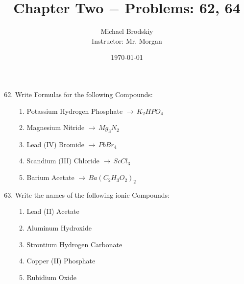 \documentclass[12pt]{article}
\title{Chapter Two $-$ Problems: 62, 64}
\date{\today}
\author{Michael Brodskiy\\ \small Instructor: Mr. Morgan}
\begin{document}
\maketitle

\begin{enumerate}
    \setcounter{enumi}{61}

  \item Write Formulas for the following Compounds:

    \begin{enumerate}

      \item Potassium Hydrogen Phosphate $\rightarrow\, K_2HPO_4$

      \item Magnesium Nitride $\rightarrow\, Mg_3N_2$

      \item Lead (IV) Bromide $\rightarrow\, PbBr_4$

      \item Scandium (III) Chloride $\rightarrow\, ScCl_3$

      \item Barium Acetate $\rightarrow\, Ba(C_2H_3O_2)_2$

    \end{enumerate}

    \setcounter{enumi}{63}

  \item Write the names of the following ionic Compounds:

    \begin{enumerate}

      \item Lead (II) Acetate

      \item Aluminum Hydroxide

      \item Strontium Hydrogen Carbonate

      \item Copper (II) Phosphate

      \item Rubidium Oxide

    \end{enumerate}


\end{enumerate}
\end{document}
